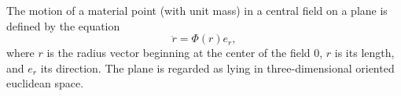 The motion of a material point (with unit mass) in a central field on a plane is defined by the equation
$$\ddot{r} = \Phi(r)e_r,$$
where $r$ is the radius vector beginning at the center of the field $0$, $r$ is its length, and $e_r$ its direction. The plane is regarded as lying in three-dimensional oriented euclidean space.

